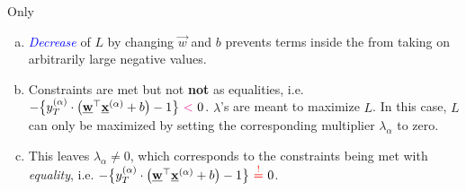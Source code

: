 \begin{frame}{Only}
{\begin{enumerate}[(a)]
{\begin{figure}[ht]
\begin{subfigure}[t]{0.3\textwidth}
{         }
     \end{subfigure}
	 \label{fig:violate}
\end{figure}
	}
	
	\begin{equation}
	\lambda_\alpha \uparrow \; \leadsto\quad L {\color{darkgreen}\uparrow} \; \leadsto \; \text{change in } \vec w,b \; \leadsto\; L {\color{blue}\downarrow}\slidesonly{\hspace{5cm}}
	\end{equation}
	
	\item<only@3> \emph{\textcolor{blue}{Decrease}} of $L$ by changing $\vec w$ and $b$ prevents terms inside the   from taking on arbitrarily large negative values.
	
	\item<only@4> Constraints are met but not \textbf{not} as equalities, i.e.
	\begingroup 
	\footnotesize
	$
	-\big\{ y_{T}^{(\alpha)} \cdot \big( \vec w^{\top} \vec x^{(\alpha)} + b \big) -1 \big\}~{\color{magenta}{<}}~0
	$\endgroup. $\lambda$'s are meant to maximize $L$. In this case, $L$ can only be maximized by setting the corresponding multiplier $\lambda_\alpha$ to zero.
	
	\item<only@5,6>  This leaves $\lambda_\alpha \ne 0$, which corresponds to the constraints being met with \emph{equality}, i.e. 
	\begingroup 
	\footnotesize
	$
	-\big\{ y_{T}^{(\alpha)} \cdot \big( \vec w^{\top} \vec x^{(\alpha)} + b \big) -1 \big\}~{\color{red}{\eqexcl}}~0
	$\endgroup. 

	\\


\end{enumerate}}
\end{frame}
